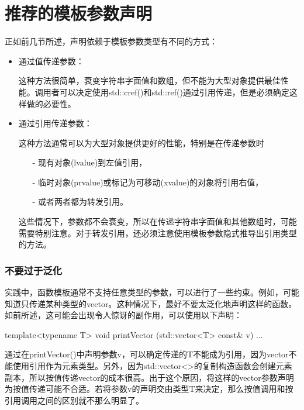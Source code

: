 \section{推荐的模板参数声明}
正如前几节所述，声明依赖于模板参数类型有不同的方式：

\begin{itemize}
\item 
通过值传递参数：

这种方法很简单，衰变字符串字面值和数组，但不能为大型对象提供最佳性能。调用者可以决定使用std::cref()和std::ref()通过引用传递，但是必须确定这样做的必要性。

\item 
通过引用传递参数：

这种方法通常可以为大型对象提供更好的性能，特别是在传递参数时

\begin{itemize}
\item[-]
现有对象(lvalue)到左值引用，

\item[-]
临时对象(prvalue)或标记为可移动(xvalue)的对象将引用右值，

\item[-]
或者两者都为转发引用。
\end{itemize}

这些情况下，参数都不会衰变，所以在传递字符串字面值和其他数组时，可能需要特别注意。对于转发引用，还必须注意使用模板参数隐式推导出引用类型的方法。
\end{itemize}

\subsubsection{不要过于泛化}

实践中，函数模板通常不支持任意类型的参数，可以进行了一些约束。例如，可能知道只传递某种类型的vector。这种情况下，最好不要太泛化地声明这样的函数。如前所述，这可能会出现令人惊讶的副作用，可以使用以下声明：

\begin{cpp}
template<typename T>
void printVector (std::vector<T> const& v)
{
	...
}
\end{cpp}

通过在printVector()中声明参数v，可以确定传递的T不能成为引用，因为vector不能使用引用作为元素类型。另外，因为std::vector<>的复制构造函数会创建元素副本，所以按值传递vector的成本很高。出于这个原因，将这样的vector参数声明为按值传递可能不合适。若将参数v的声明交由类型T来决定，那么按值调用和按引用调用之间的区别就不那么明显了。

